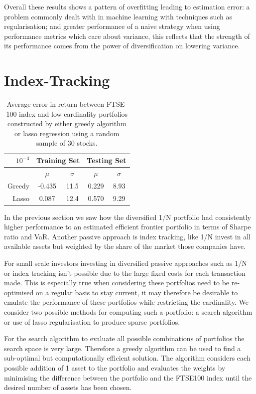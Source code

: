 \documentclass[a4paper,10pt, twocolumn]{article}
\begin{document}
Overall these results shows a pattern of overfitting leading to estimation error: a problem commonly dealt with in machine learning with techniques such as regularisation; and greater performance of a naive strategy when using performance metrics which care about variance, this reflects that the strength of its performance comes from the power of diversification on lowering variance.

\section{Index-Tracking}
\begin{table}
\begin{tabular}{|r|c|c|c|c|}
\hline
$10^{-3}$ & \multicolumn{2}{|c|}{Training Set} & \multicolumn{2}{|c|}{Testing Set} \\
\hline
& $\mu$ & $\sigma$ & $\mu$ & $\sigma$ \\
\hline
Greedy & -0.435 & 11.5 & 0.229 & 8.93\\
\hline
Lasso & 0.087 & 12.4 & 0.570 & 9.29\\
\hline
\end{tabular}
\caption{Average error in return between FTSE-100 index and low cardinality portfolios constructed by either greedy algorithm or lasso regression using a random sample of 30 stocks.}
\label{tab:1}
\end{table}

In the previous section we saw how the diversified 1/N portfolio had consistently higher performance to an estimated efficient frontier portfolio in terms of Sharpe ratio and VaR. Another passive approach is index tracking, like 1/N invest in all available assets but weighted by the share of the market those companies have.

For small scale investors investing in diversified passive approaches such as 1/N or index tracking isn't possible due to the large fixed costs for each transaction made. This is especially true when considering these portfolios need to be re-optimised on a regular basis to stay current, it may therefore be desirable to emulate the performance of these portfolios while restricting the cardinality. We consider two possible methods for computing such a portfolio: a search algorithm or use of lasso regularisation to produce sparse portfolios. 

For the search algorithm to evaluate all possible combinations of portfolios the search space is very large. Therefore a greedy algorithm can be used to find a sub-optimal but computationally efficient solution. The algorithm considers each possible addition of 1 asset to the portfolio and evaluates the weights by minimising the difference between the portfolio and the FTSE100 index until the desired number of assets has been chosen. 
\end{document}
